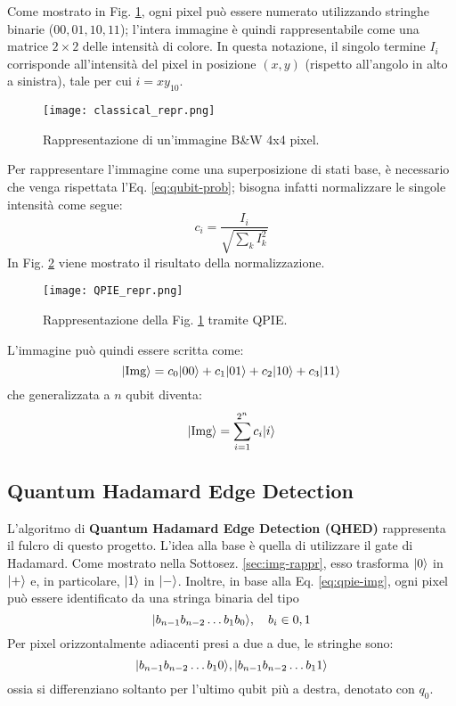 Come mostrato in Fig.
\ref{fig:bw-4x4-img},
ogni pixel può essere numerato utilizzando stringhe binarie ($00,01,10,11$);
l'intera immagine è quindi
rappresentabile come una matrice $2\times2$ delle intensità di colore. In questa
notazione, il singolo termine $I_{i}$ corrisponde all'intensità del pixel in posizione
$(x,y)$ (rispetto all'angolo in alto a sinistra), tale per cui $i = {xy}_{10}$.
\begin{figure}[h!]
    \centering
    \texttt{[image: classical\_repr.png]}
		\caption{Rappresentazione di un'immagine B\&W 4x4 pixel.}
    \label{fig:bw-4x4-img}
\end{figure}

Per rappresentare l'immagine come una superposizione di stati base, è necessario
che venga rispettata l'Eq. \ref{eq:qubit-prob}; bisogna infatti normalizzare le singole intensità come segue:
\begin{equation}
	c_i = \frac{I_i}{\sqrt{\sum_{k}^{}{I_{k}^2}}}
	\label{eq:intensities-norm}
\end{equation}
In Fig. \ref{fig:bw-4x4-img-qpie}
viene mostrato il risultato della normalizzazione.
\begin{figure}[h!]
    \centering
    \texttt{[image: QPIE\_repr.png]}
		\caption{Rappresentazione della Fig. \ref{fig:bw-4x4-img} tramite QPIE.}
    \label{fig:bw-4x4-img-qpie}
\end{figure}

L'immagine può quindi essere scritta come:
\begin{equation*}
	\lvert\text{Img}\rangle
		= c_0 \lvert00\rangle + c_1 \lvert01\rangle + c_2 \lvert10\rangle + c_3 \lvert11\rangle
	\label{eq:qpie-img-2qubit}
\end{equation*}
che generalizzata a $n$ qubit diventa:
\begin{equation}
	\lvert\text{Img}\rangle
		= \sum_{i=1}^{2^n} c_i \lvert i\rangle
	\label{eq:qpie-img}
\end{equation}


\subsection{Quantum Hadamard Edge Detection}

L'algoritmo di \textbf{Quantum Hadamard Edge Detection (QHED)} \cite{qpie} rappresenta il
fulcro di questo progetto. L'idea alla base è quella di utilizzare il gate di
Hadamard. Come mostrato nella Sottosez.
\ref{sec:img-rappr}, esso trasforma
$\lvert0\rangle$ in $\lvert+\rangle$ e, in particolare, $\lvert1\rangle$ in $\lvert-\rangle$. Inoltre, in
base alla Eq. \ref{eq:qpie-img}, ogni pixel può essere identificato
da una stringa binaria del tipo 
\[
	\lvert b_{n-1}b_{n-2}\ldots b_1b_0\rangle,\quad b_i \in {0,1}
\]
Per pixel orizzontalmente adiacenti presi a due a due, le stringhe sono:
\[
	\lvert b_{n-1}b_{n-2}\ldots b_10\rangle, \lvert b_{n-1}b_{n-2}\ldots b_11\rangle
\]
ossia si differenziano soltanto per l'ultimo qubit più a destra, denotato con $q_0$.

